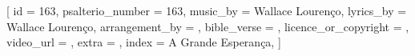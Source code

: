 

[
    id                     = {163},
    psalterio_number       = {163},
    music_by               = {Wallace Lourenço},
    lyrics_by              = {Wallace Lourenço},
    arrangement_by         = {},
    bible_verse            = {},
    licence_or_copyright   = {},
    video_url              = {},
    extra                  = {},
    index                  = {A Grande Esperança},
]



\beginverse

